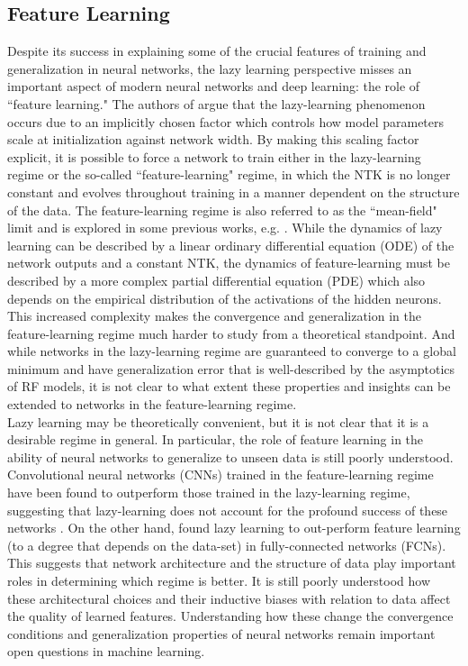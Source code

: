 \documentclass[11pt]{article}
\begin{document}
\subsection{Feature Learning}

Despite its success in explaining some of the crucial features of training and generalization in neural networks, the lazy learning perspective misses an important aspect of modern neural networks and deep learning: the role of ``feature learning."  The authors of \cite{chizatLazyTrainingDifferentiable2020} argue that the lazy-learning phenomenon occurs due to an implicitly chosen factor which controls how model parameters scale at initialization against network width. By making this scaling factor explicit, it is possible to force a network to train either in the lazy-learning regime or the so-called ``feature-learning" regime, in which the NTK is no longer constant and evolves throughout training in a manner dependent on the structure of the data. The feature-learning regime is also referred to as the ``mean-field" limit and is explored in some previous works, e.g. \cite{meiMeanFieldView2018}. While the dynamics of lazy learning can be described by a linear ordinary differential equation (ODE) of the network outputs and a constant NTK, the dynamics of feature-learning must be described by a more complex partial differential equation (PDE) which also depends on the empirical distribution of the activations of the hidden neurons. This increased complexity makes the convergence and generalization in the feature-learning regime much harder to study from a theoretical standpoint. And while networks in the lazy-learning regime are guaranteed to converge to a global minimum and have generalization error that is well-described by the asymptotics of RF models, it is not clear to what extent these properties and insights can be extended to networks in the feature-learning regime. \\

Lazy learning may be theoretically convenient, but it is not clear that it is a desirable regime in general. In particular, the role of feature learning in the ability of neural networks to generalize to unseen data is still poorly understood. Convolutional neural networks (CNNs) trained in the feature-learning regime have been found to outperform those trained in the lazy-learning regime, suggesting that lazy-learning does not account for the profound success of these networks \cite{chizatLazyTrainingDifferentiable2020}. On the other hand, \cite{geigerDisentanglingFeatureLazy2020} found lazy learning to out-perform feature learning (to a degree that depends on the data-set) in fully-connected networks (FCNs). This suggests that network architecture and the structure of data play important roles in determining which regime is better. It is still poorly understood how these architectural choices and their inductive biases with relation to data affect the quality of learned features. Understanding how these change the convergence conditions and generalization properties of neural networks remain important open questions in machine learning. 
 
\end{document}
